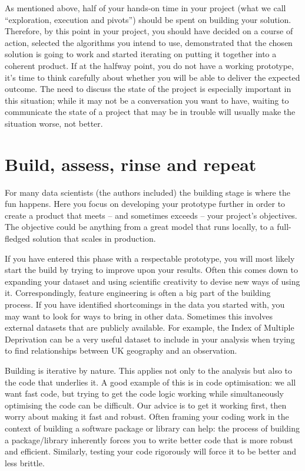 \documentclass[
]{book}
\begin{document}
As mentioned above, half of your hands-on time in your project (what we
call ``exploration, execution and pivots'') should be spent on building
your solution. Therefore, by this point in your project, you should have
decided on a course of action, selected the algorithms you intend to
use, demonstrated that the chosen solution is going to work and started
iterating on putting it together into a coherent product. If at the
halfway point, you do not have a working prototype, it's time to think
carefully about whether you will be able to deliver the expected
outcome. The need to discuss the state of the project is especially
important in this situation; while it may not be a conversation you want
to have, waiting to communicate the state of a project that may be in
trouble will usually make the situation worse, not better.

\hypertarget{build-assess-rinse-and-repeat}{%
\section{Build, assess, rinse and
repeat}\label{build-assess-rinse-and-repeat}}

For many data scientists (the authors included) the building stage is
where the fun happens. Here you focus on developing your prototype
further in order to create a product that meets -- and sometimes exceeds
-- your project's objectives. The objective could be anything from a
great model that runs locally, to a full-fledged solution that scales in
production.

If you have entered this phase with a respectable prototype, you will
most likely start the build by trying to improve upon your results.
Often this comes down to expanding your dataset and using scientific
creativity to devise new ways of using it. Correspondingly, feature
engineering is often a big part of the building process. If you have
identified shortcomings in the data you started with, you may want to
look for ways to bring in other data. Sometimes this involves external
datasets that are publicly available. For example, the Index of Multiple
Deprivation can be a very useful dataset to include in your analysis
when trying to find relationships between UK geography and an
observation.

Building is iterative by nature. This applies not only to the analysis
but also to the code that underlies it. A good example of this is in
code optimisation: we all want fast code, but trying to get the code
logic working while simultaneously optimising the code can be difficult.
Our advice is to get it working first, then worry about making it fast
and robust. Often framing your coding work in the context of building a
software package or library can help: the process of building a
package/library inherently forces you to write better code that is more
robust and efficient. Similarly, testing your code rigorously will force
it to be better and less brittle.
\end{document}
